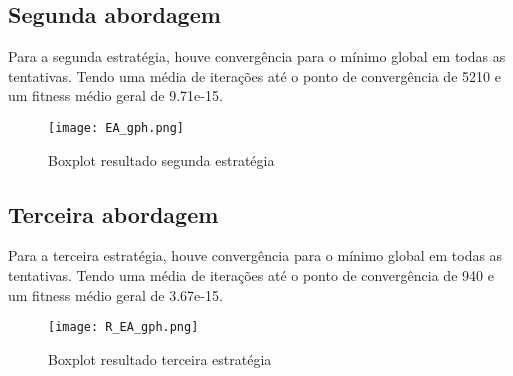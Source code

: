 \documentclass[
	article,			%
	11pt,				%
	oneside,			%
	a4paper,			%
	english,			%
	brazil,				%
	]{abntex2}
\begin{document}
\subsection{Segunda abordagem}
Para a segunda estratégia, houve convergência para o mínimo global em todas as tentativas. Tendo uma média de iterações até o ponto de convergência de 5210 e um fitness médio geral de 9.71e-15.
\begin{figure}[h]
    \centering
    \texttt{[image: EA\_gph.png]}
    \caption{Boxplot resultado segunda estratégia}
\end{figure}
\subsection{Terceira abordagem}
Para a terceira estratégia, houve convergência para o mínimo global em todas as tentativas. Tendo uma média de iterações até o ponto de convergência de 940 e um fitness médio geral de 3.67e-15.
\begin{figure}[h]
    \centering
    \texttt{[image: R\_EA\_gph.png]}
    \caption{Boxplot resultado terceira estratégia}
\end{figure}

% 
\end{document}
